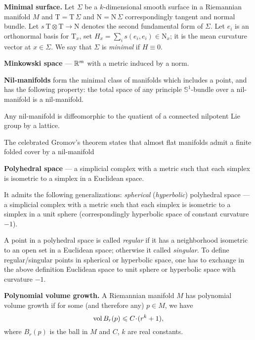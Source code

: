 \begin{description}
\item{\bf Minimal surface.}\label{Minimal surface} Let $\Sigma$ be a $k$-dimensional smooth surface in
a Riemannian manifold $M$
and $\mathrm{T}=\mathrm{T}\,\Sigma$ and $\mathrm{N}=\mathrm{N}\,\Sigma$ correspondingly tangent and normal bundle.
Let $s\:\mathrm{T}\otimes \mathrm{T}\to \mathrm{N}$ denotes the second fundamental form of $\Sigma$.
Let  $e_i$ is an orthonormal basis for $\mathrm{T}_x$, 
set $H_x=\sum_i s(e_i,e_i)\in \mathrm{N}_x$; 
it is the mean curvature vector at $x\in \Sigma$. 
We say that $\Sigma$ is \emph{minimal} if $H\equiv 0$.

\item{\bf Minkowski space}\label{Minkowski space} --- $\mathbb{R}^m$ with a metric induced by a norm.

\item{\bf Nil-manifolds}\label{Nil-manifolds} form the minimal class of manifolds which includes a point, and has the following property:  
the total space of any principle $\mathbb{S}^1$-bundle over a nil-manifold is a nil-manifold. 

Any nil-manifold is diffeomorphic to the quatient of a connected nilpotent Lie group by a lattice.

The celebrated Gromov's theorem states that almost flat manifolds admit a finite folded cover by a nil-manifold


\item{\bf Polyhedral space}\label{Polyhedral space} --- a simplicial complex with a metric such that each simplex is isometric to a simplex in a Euclidean space.

It admits the following generalizations: \emph{spherical} (\emph{hyperbolic}) polyhedral space --- a simplicial complex with a metric such that each simplex is isometric to a simplex in a unit sphere (correspondingly hyperbolic space of constant curvature $-1$).

A point in a polyhedral space is called \emph{regular} if it has a neighborhood isometric to an open set in a Euclidean space;
otherwise it called \emph{singular}.
To define regular/singular points in spherical or hyperbolic space,
one has to exchange in the above definition Euclidean space to unit sphere or hyperbolic space with curvature $-1$.


\item{\bf Polynomial volume growth.}\label{Polynomial volume growth} A Riemannian manifold $M$ has polynomial volume growth if for some (and therefore any) $p\in M$, 
we have 
$$\vol B_r(p)\z\le C\cdot (r^k+1),$$ 
where $B_r(p)$ is the ball in $M$ and  $C$, $k$ are real constants.


\end{description}
